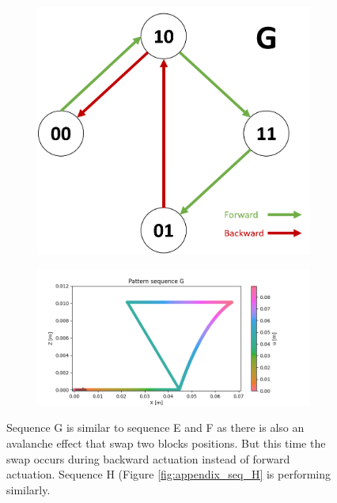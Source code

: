         \begin{figure}[h]
            \centering
            \begin{subfigure}{.2\textwidth}
            \includegraphics[width=\textwidth]{images/S_G.png}
            \end{subfigure}%
            \begin{subfigure}{.6\textwidth}
            \includegraphics[width=\textwidth]{images/G.png}
            \end{subfigure}
            \caption{Sequence G is similar to sequence E and F as there is also an avalanche effect that swap two blocks positions. But this time the swap occurs during backward actuation instead of forward actuation. Sequence H (Figure \ref{fig:appendix_seq_H} is performing similarly.}
        \end{figure}

